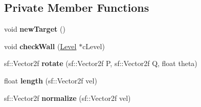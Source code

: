 \subsection*{Private Member Functions}
\begin{DoxyCompactItemize}
\item 
\mbox{\label{class_sweeper___bot_a20a47dbdd1e8d8d47da2e83e1152b0f6}} 
void {\bfseries new\+Target} ()
\item 
\mbox{\label{class_sweeper___bot_a51010ff1bd1220b45d881689b9447c54}} 
void {\bfseries check\+Wall} (\mbox{\hyperlink{class_level}{Level}} $\ast$c\+Level)
\item 
\mbox{\label{class_sweeper___bot_a84ab323444aa0389b468fe98263ba972}} 
sf\+::\+Vector2f {\bfseries rotate} (sf\+::\+Vector2f P, sf\+::\+Vector2f Q, float theta)
\item 
\mbox{\label{class_sweeper___bot_a78ddb701e3848b3f530ee6c3dcf229a3}} 
float {\bfseries length} (sf\+::\+Vector2f vel)
\item 
\mbox{\label{class_sweeper___bot_aa0166dfb400d45e4dafce93002c78db6}} 
sf\+::\+Vector2f {\bfseries normalize} (sf\+::\+Vector2f vel)
\end{DoxyCompactItemize}
